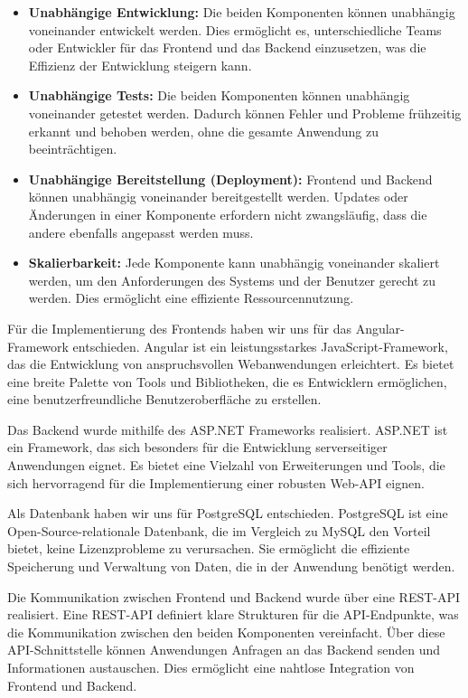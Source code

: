 \begin{itemize}
  \item \textbf{Unabhängige Entwicklung:} Die beiden Komponenten können unabhängig voneinander 
  entwickelt werden. Dies ermöglicht es, unterschiedliche Teams oder Entwickler für das Frontend 
  und das Backend einzusetzen, was die Effizienz der Entwicklung steigern kann.
  \item \textbf{Unabhängige Tests:} Die beiden Komponenten können unabhängig voneinander getestet 
  werden. Dadurch können Fehler und Probleme frühzeitig erkannt und behoben werden, ohne die 
  gesamte Anwendung zu beeinträchtigen.
  \item \textbf{Unabhängige Bereitstellung (Deployment):} Frontend und Backend können unabhängig 
  voneinander bereitgestellt werden. Updates oder Änderungen in einer Komponente erfordern 
  nicht zwangsläufig, dass die andere ebenfalls angepasst werden muss.
  \item \textbf{Skalierbarkeit:} Jede Komponente kann unabhängig voneinander skaliert werden, 
  um den Anforderungen des Systems und der Benutzer gerecht zu werden. Dies ermöglicht eine 
  effiziente Ressourcennutzung.
\end{itemize}

\noindent Für die Implementierung des Frontends haben wir uns für das Angular-Framework entschieden.
Angular ist ein leistungsstarkes JavaScript-Framework, das die Entwicklung von anspruchsvollen 
Webanwendungen erleichtert. Es bietet eine breite Palette von Tools und Bibliotheken, 
die es Entwicklern ermöglichen, eine benutzerfreundliche Benutzeroberfläche zu erstellen. \newline

\noindent Das Backend wurde mithilfe des ASP.NET Frameworks realisiert. 
ASP.NET ist ein Framework, das sich besonders für die Entwicklung serverseitiger Anwendungen eignet. 
Es bietet eine Vielzahl von Erweiterungen und Tools, die sich hervorragend für die Implementierung 
einer robusten Web-API eignen.\newline

\noindent Als Datenbank haben wir uns für PostgreSQL entschieden. 
PostgreSQL ist eine Open-Source-relationale Datenbank, die im Vergleich zu MySQL den Vorteil bietet, 
keine Lizenzprobleme zu verursachen. Sie ermöglicht die effiziente Speicherung und Verwaltung von 
Daten, die in der Anwendung benötigt werden.\newline

\noindent Die Kommunikation zwischen Frontend und Backend wurde über eine REST-API realisiert. 
Eine REST-API definiert klare Strukturen für die API-Endpunkte, was die Kommunikation zwischen 
den beiden Komponenten vereinfacht. Über diese API-Schnittstelle können Anwendungen Anfragen an 
das Backend senden und Informationen austauschen. Dies ermöglicht eine nahtlose Integration 
von Frontend und Backend.\newline

